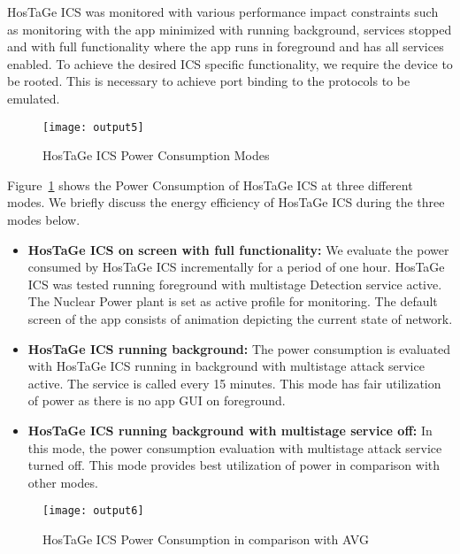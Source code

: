 \documentclass[article,msc=informatik,type=msc,colorback,accentcolor=tud9c]{tudthesis}
\begin{document}
	HosTaGe ICS was monitored with various performance impact constraints such as  monitoring with the app minimized with running background, services stopped and with full functionality where the app runs in foreground and has all services enabled. To achieve the desired ICS specific functionality, we require the device to be rooted. This is necessary to achieve port binding to the protocols to be emulated. 
	
	
	\begin{figure}[H]
	\centering
	\texttt{[image: output5]}
	\caption[HosTaGe ICS Power Consumption Modes ]{\label{f:HosTaGe ICS Power Consumption Modes}HosTaGe ICS Power Consumption Modes}
	\end{figure}
	
	
	
	
	
	Figure~\ref{f:HosTaGe ICS Power Consumption Modes} shows the Power Consumption of HosTaGe ICS at three different modes.  We briefly discuss the energy efficiency of HosTaGe ICS during the three modes below.
	\begin{itemize}
	
	\item\textbf{HosTaGe ICS on screen with full functionality:} We evaluate the power consumed by HosTaGe ICS incrementally for a period of one hour. HosTaGe ICS was tested running foreground with multistage Detection service active. The Nuclear Power plant is set as active profile for monitoring. The default screen of the app consists of animation depicting the current state of network.
	
	\item\textbf{HosTaGe ICS running background:} The power consumption is evaluated with HosTaGe ICS running in background with multistage attack service active. The service is called every 15 minutes. This mode has fair utilization of power as there is no app GUI on foreground.
	
	\item\textbf{HosTaGe ICS running background with multistage service off: } In this mode, the power consumption evaluation with multistage attack service turned off. This mode provides best utilization of power in comparison with other modes.
	
	\end{itemize}
	
	
	\begin{figure}[H]
		\centering
		\texttt{[image: output6]}
		\caption[HosTaGe ICS Power Consumption in comparison with AVG]{\label{f:HosTaGe ICS Power Consumption in comparison with AVG}HosTaGe ICS Power Consumption in comparison with AVG}
		\end{figure}
	
\end{document}
